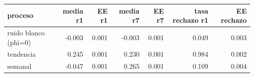 \begin{tabular}{lrrrrrr}
\toprule
proceso & media r1 & EE r1 & media r7 & EE r7 & tasa rechazo r1 & EE rechazo \\
\midrule
ruido blanco (phi=0) & -0.003 & 0.001 & -0.003 & 0.001 & 0.049 & 0.003 \\
tendencia & 0.245 & 0.001 & 0.230 & 0.001 & 0.984 & 0.002 \\
semanal & -0.047 & 0.001 & 0.265 & 0.001 & 0.109 & 0.004 \\
\bottomrule
\end{tabular}